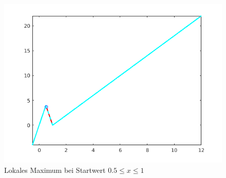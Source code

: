 \documentclass{hbrs-ecta-report}
\begin{document}
\FloatBarrier
\newpage

\begin{figure}[t]
	\includegraphics[width=\linewidth]{img/plot_fit_local_max_right.png}
	\caption{Lokales Maximum bei Startwert  $0.5 \leq x\leq1$ }
	\label{fig:fit_local_max_right} 
\end{figure}
\end{document}
